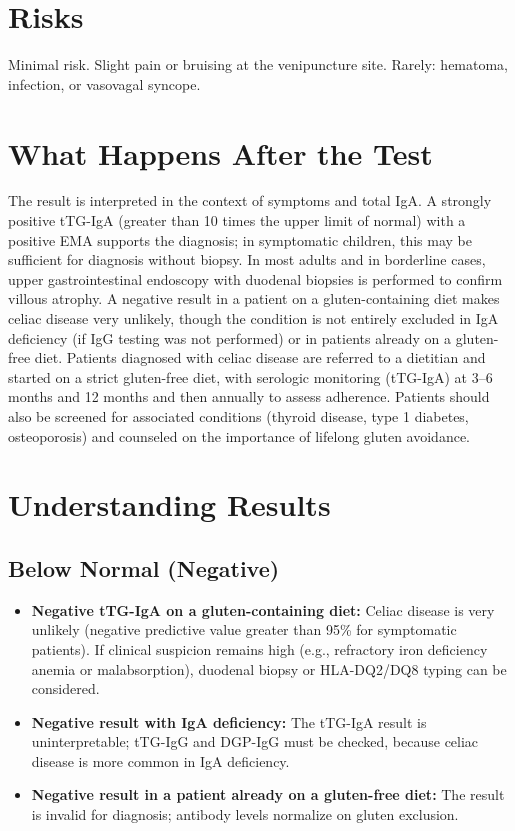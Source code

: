 \section*{Risks}
Minimal risk. Slight pain or bruising at the venipuncture site. Rarely: hematoma, infection, or vasovagal syncope.

\section*{What Happens After the Test}
The result is interpreted in the context of symptoms and total IgA. A strongly positive tTG-IgA (greater than 10 times the upper limit of normal) with a positive EMA supports the diagnosis; in symptomatic children, this may be sufficient for diagnosis without biopsy. In most adults and in borderline cases, upper gastrointestinal endoscopy with duodenal biopsies is performed to confirm villous atrophy. A negative result in a patient on a gluten-containing diet makes celiac disease very unlikely, though the condition is not entirely excluded in IgA deficiency (if IgG testing was not performed) or in patients already on a gluten-free diet. Patients diagnosed with celiac disease are referred to a dietitian and started on a strict gluten-free diet, with serologic monitoring (tTG-IgA) at 3--6 months and 12 months and then annually to assess adherence. Patients should also be screened for associated conditions (thyroid disease, type 1 diabetes, osteoporosis) and counseled on the importance of lifelong gluten avoidance.

\section*{Understanding Results}

\subsection*{Below Normal (Negative)}
\begin{itemize}
  \item \textbf{Negative tTG-IgA on a gluten-containing diet:} Celiac disease is very unlikely (negative predictive value greater than 95\% for symptomatic patients). If clinical suspicion remains high (e.g., refractory iron deficiency anemia or malabsorption), duodenal biopsy or HLA-DQ2/DQ8 typing can be considered.
  \item \textbf{Negative result with IgA deficiency:} The tTG-IgA result is uninterpretable; tTG-IgG and DGP-IgG must be checked, because celiac disease is more common in IgA deficiency.
  \item \textbf{Negative result in a patient already on a gluten-free diet:} The result is invalid for diagnosis; antibody levels normalize on gluten exclusion.
\end{itemize}

